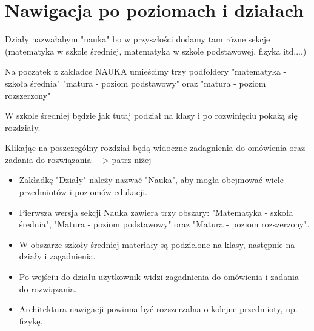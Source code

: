 \documentclass[12pt,a4paper]{report}
\begin{document}
\section{Nawigacja po poziomach i działach}
\begin{ElearnReviewComment}[title={Komentarz nr 5 -- Anna Kogut, 2026-07-22}]
Działy nazwałabym "nauka" bo w przyszłości dodamy tam rózne sekcje (matematyka w szkole średniej, matematyka w szkole podstawowej, fizyka itd....)

Na początek z zakładce NAUKA umieścimy trzy podfoldery "matematyka - szkoła średnia" "matura - poziom podstawowy" oraz "matura - poziom rozszerzony"

W szkole średniej będzie jak tutaj podział na klasy i po rozwinięciu pokażą się rozdziały.

Klikając na poszczególny rozdział będą widoczne zadagnienia do omówienia oraz zadania do rozwiązania ---> patrz niżej
\end{ElearnReviewComment}
\begin{ElearnRequirement}[title={Wymagania wynikające z komentarza}]
\begin{itemize}
  \item Zakładkę "Działy" należy nazwać "Nauka", aby mogła obejmować wiele przedmiotów i poziomów edukacji.
  \item Pierwsza wersja sekcji Nauka zawiera trzy obszary: "Matematyka - szkoła średnia", "Matura - poziom podstawowy" oraz "Matura - poziom rozszerzony".
  \item W obszarze szkoły średniej materiały są podzielone na klasy, następnie na działy i zagadnienia.
  \item Po wejściu do działu użytkownik widzi zagadnienia do omówienia i zadania do rozwiązania.
  \item Architektura nawigacji powinna być rozszerzalna o kolejne przedmioty, np. fizykę.
\end{itemize}
\end{ElearnRequirement}
\end{document}
